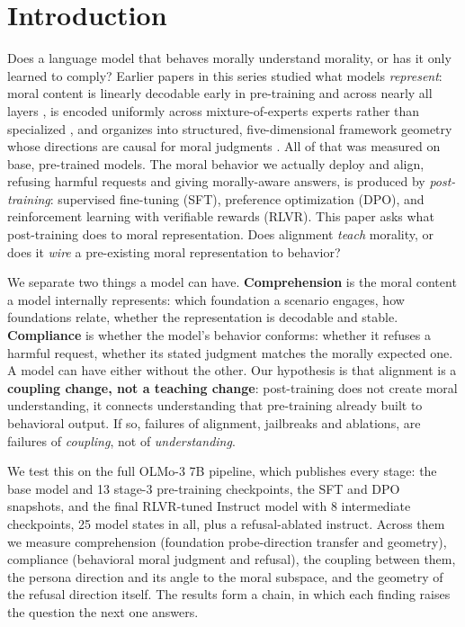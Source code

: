 \section{Introduction}\label{introduction}

Does a language model that behaves morally understand morality, or has it
only learned to comply? Earlier papers in this series studied what models
\emph{represent}: moral content is linearly decodable early in pre-training and
across nearly all layers \citep{reblitzrichardson2026fragility}, is encoded
uniformly across mixture-of-experts experts rather than specialized
\citep{reblitzrichardson2026dilution}, and organizes into structured,
five-dimensional framework geometry whose directions are causal for moral
judgments \citep{reblitzrichardson2026geometry, reblitzrichardson2026causal}.
All of that was measured on base, pre-trained models. The moral behavior we
actually deploy and align, refusing harmful requests and giving
morally-aware answers, is produced by \emph{post-training}: supervised fine-tuning
(SFT), preference optimization (DPO), and reinforcement learning with
verifiable rewards (RLVR). This paper asks what post-training does to moral
representation. Does alignment \emph{teach} morality, or does it \emph{wire} a
pre-existing moral representation to behavior?

We separate two things a model can have. \textbf{Comprehension} is the moral content
a model internally represents: which foundation a scenario engages, how
foundations relate, whether the representation is decodable and stable.
\textbf{Compliance} is whether the model's behavior conforms: whether it refuses a
harmful request, whether its stated judgment matches the morally expected one.
A model can have either without the other. Our hypothesis is that alignment is a
\textbf{coupling change, not a teaching change}: post-training does not create moral
understanding, it connects understanding that pre-training already built to
behavioral output. If so, failures of alignment, jailbreaks and ablations, are
failures of \emph{coupling}, not of \emph{understanding}.

We test this on the full OLMo-3 7B pipeline, which publishes every stage:
the base model and 13 stage-3 pre-training checkpoints, the SFT and DPO
snapshots, and the final RLVR-tuned Instruct model with 8 intermediate
checkpoints, 25 model states in all, plus a refusal-ablated instruct.
Across them we measure comprehension (foundation probe-direction transfer and
geometry), compliance (behavioral moral judgment and refusal), the coupling
between them, the persona direction and its angle to the moral subspace, and
the geometry of the refusal direction itself. The results form a chain, in
which each finding raises the question the next one answers.

